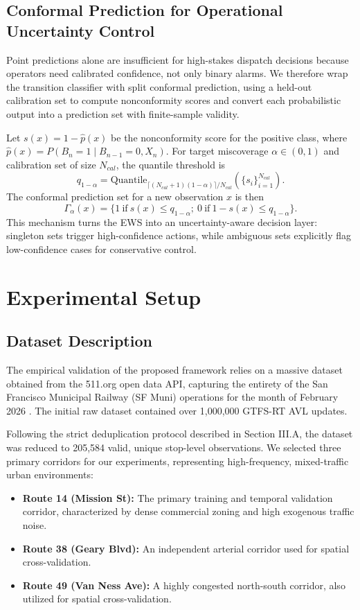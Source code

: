 \documentclass[journal,twocolumn]{IEEEtran}
\begin{document}
\subsection{Conformal Prediction for Operational Uncertainty Control}
Point predictions alone are insufficient for high-stakes dispatch decisions because operators need calibrated confidence, not only binary alarms. We therefore wrap the transition classifier with split conformal prediction, using a held-out calibration set to compute nonconformity scores and convert each probabilistic output into a prediction set with finite-sample validity.

Let $s(x)=1-\hat{p}(x)$ be the nonconformity score for the positive class, where $\hat{p}(x)=P(B_n=1\mid B_{n-1}=0, X_n)$. For target miscoverage $\alpha\in(0,1)$ and calibration set of size $N_{cal}$, the quantile threshold is
\begin{equation}
	q_{1-\alpha}=\text{Quantile}_{\lceil (N_{cal}+1)(1-\alpha)\rceil /N_{cal}}\left(\{s_i\}_{i=1}^{N_{cal}}\right).
\end{equation}
The conformal prediction set for a new observation $x$ is then
\begin{equation}
	\Gamma_{\alpha}(x)=\{1\ \text{if}\ s(x)\le q_{1-\alpha};\ 0\ \text{if}\ 1-s(x)\le q_{1-\alpha}\}.
\end{equation}
This mechanism turns the EWS into an uncertainty-aware decision layer: singleton sets trigger high-confidence actions, while ambiguous sets explicitly flag low-confidence cases for conservative control.

\section{Experimental Setup}

\subsection{Dataset Description}
The empirical validation of the proposed framework relies on a massive dataset obtained from the 511.org open data API, capturing the entirety of the San Francisco Municipal Railway (SF Muni) operations for the month of February 2026 \cite{28}. The initial raw dataset contained over 1,000,000 GTFS-RT AVL updates.

Following the strict deduplication protocol described in Section III.A, the dataset was reduced to 205,584 valid, unique stop-level observations. We selected three primary corridors for our experiments, representing high-frequency, mixed-traffic urban environments:
\begin{itemize}
	\item \textbf{Route 14 (Mission St):} The primary training and temporal validation corridor, characterized by dense commercial zoning and high exogenous traffic noise.
	\item \textbf{Route 38 (Geary Blvd):} An independent arterial corridor used for spatial cross-validation.
	\item \textbf{Route 49 (Van Ness Ave):} A highly congested north-south corridor, also utilized for spatial cross-validation.
\end{itemize}
\end{document}

